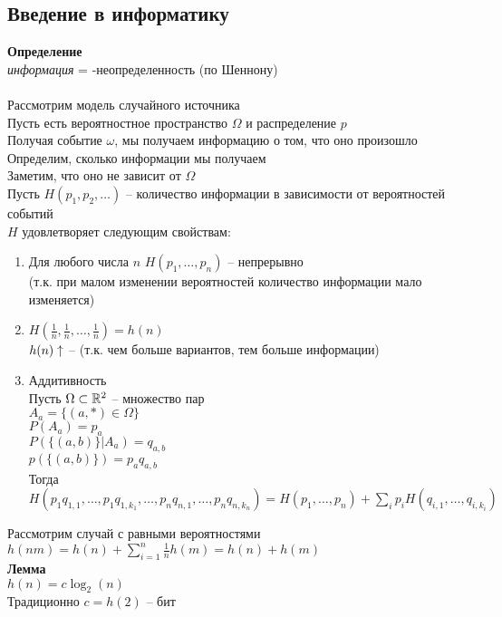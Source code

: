 \documentclass[12pt]{article}
\begin{document}
\subsection{Введение в информатику}
\textbf{Определение}\\
\textit{информация} = -неопределенность (по Шеннону)\\\\
Рассмотрим модель случайного источника\\
Пусть есть вероятностное пространство $\Omega$ и распределение $p$\\
Получая событие $\omega$, мы получаем информацию о том, что оно произошло\\
Определим, сколько информации мы получаем\\
Заметим, что оно не зависит от $\Omega$\\
Пусть $H(p_1, p_2, \ldots)$ -- количество информации в зависимости от вероятностей событий\\
$H$ удовлетворяет следующим свойствам:\\
\begin{enumerate}
    \item Для любого числа $n$ $H(p_1, \ldots, p_n)$ -- непрерывно\\
    (т.к. при малом изменении вероятностей количество информации мало изменяется)
    \item $H(\frac1n, \frac1n, \ldots, \frac1n) = h(n)$\\
    $h(n) \uparrow$ -- (т.к. чем больше вариантов, тем больше информации)
    \item Аддитивность\\
    Пусть $\Omega \subset \mathbb{R}^2$ -- множество пар\\
    $A_a = \{ (a,*) \in \Omega \}$\\
    $P(A_a) = p_a$\\
    $P(\{(a,b)\} | A_a) = q_{a,b}$\\
    $p(\{(a,b)\}) = p_a q_{a,b}$\\
    Тогда $H(p_1q_{1,1}, \ldots, p_1q_{1,k_1}, \ldots, p_nq_{n,1}, \ldots, p_nq_{n,k_n}) = H(p_1, \ldots, p_n) + \sum_{i} p_i H(q_{i,1}, \ldots, q_{i,k_i})$
\end{enumerate}
Рассмотрим случай с равными вероятностями\\
$h(nm) = h(n) + \sum_{i=1}^n \frac1n h(m) = h(n) + h(m)$\\
\textbf{Лемма}\\
$h(n) = c\log_2(n)$\\
Традиционно $c=h(2)$ -- бит\\
\end{document}
